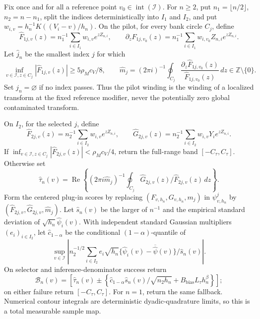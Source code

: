 Fix once and for all a reference point \(v_0\in\operatorname{int}(\mathcal I)\).  For \(n\ge2\), put \(n_1=\lfloor n/2\rfloor\), \(n_2=n-n_1\), split the indices deterministically into \(I_1\) and \(I_2\), and put \(w_{i,v}=h_n^{-1}K((V_i-v)/h_n)\).  On the pilot, for every bank circle \(C_j\), define
\[
 \widehat F_{1j,v}(z)=n_1^{-1}\sum_{i\in I_1}w_{i,v}e^{zZ_{n,i}},
 \qquad
 \partial_z\widehat F_{1j,v_0}(z)
 =n_1^{-1}\sum_{i\in I_1}w_{i,v_0}Z_{n,i}e^{zZ_{n,i}}.
\]
Let \(\widehat j_n\) be the smallest index \(j\) for which
\[
 \inf_{v\in\mathcal I,z\in C_j}|\widehat F_{1j,v}(z)|
 \ge5\rho_Mc_V/8,
 \qquad
 \widehat m_j=(2\pi i)^{-1}\oint_{C_j}
 \frac{\partial_z\widehat F_{1j,v_0}(z)}{\widehat F_{1j,v_0}(z)}\,dz
 \in\mathbb Z\setminus\{0\}.
\]
Set \(\widehat j_n=\varnothing\) if no index passes.  Thus the pilot winding is the winding of a localized transform at the fixed reference modifier, never the potentially zero global contaminated transform.

On \(I_2\), for the selected \(j\), define
\[
 \widehat F_{2j,v}(z)=n_2^{-1}\sum_{i\in I_2}w_{i,v}e^{zZ_{n,i}},
 \qquad
 \widehat G_{2j,v}(z)=n_2^{-1}\sum_{i\in I_2}w_{i,v}Y_i e^{zZ_{n,i}}.
\]
If \(\inf_{v\in\mathcal I,z\in C_j}|\widehat F_{2j,v}(z)|<\rho_Mc_V/4\), return the full-range band \([-C_\tau,C_\tau]\).  Otherwise set
\[
 \widehat\tau_n(v)=\operatorname{Re}\left\{(2\pi i\widehat m_j)^{-1}
 \oint_{C_j}\widehat G_{2j,v}(z)/\widehat F_{2j,v}(z)\,dz\right\}.
\]
Form the centered plug-in scores by replacing \((F_{v,h_n},G_{v,h_n},m_j)\) in \(\psi^j_{v,h_n}\) by \((\widehat F_{2j,v},\widehat G_{2j,v},\widehat m_j)\).  Let \(\widehat s_n(v)\) be the larger of \(n^{-1}\) and the empirical standard deviation of \(\sqrt{h_n}\widehat\psi_i(v)\).  With independent standard Gaussian multipliers \((e_i)_{i\in I_2}\), let \(\widehat c_{1-\alpha}\) be the conditional \((1-\alpha)\)-quantile of
\[
 \sup_{v\in\mathcal I}\left|n_2^{-1/2}\sum_{i\in I_2}e_i\sqrt{h_n}
 \{\widehat\psi_i(v)-\overline{\widehat\psi}(v)\}/\widehat s_n(v)\right|.
\]
On selector and inference-denominator success return
\[
 \mathcal B_n(v)=\left[\widehat\tau_n(v)\pm
 \left\{\widehat c_{1-\alpha}\widehat s_n(v)/\sqrt{n_2h_n}
 +B_{\mathrm{bias}}L_\tau h_n^\beta\right\}\right];
\]
on either failure return \([-C_\tau,C_\tau]\).  For \(n=1\), return the same fallback.  Numerical contour integrals are deterministic dyadic-quadrature limits, so this is a total measurable sample map.
